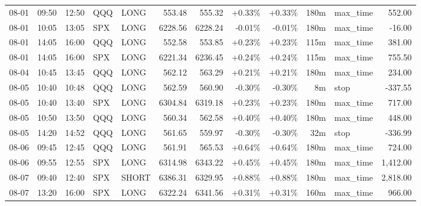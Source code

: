 \documentclass[11pt,a4paper,twoside]{article}
\begin{document}
\begin{center}
\begin{longtable}{>{\color{txtmain}}l l l l l r r r r r >{\color{txtmain}}l r}
08-01 & 09:50 & 12:50 & QQQ & LONG & 553.48 & 555.32 & \textcolor{wingreen}{+0.33\%} & \textcolor{wingreen}{+0.33\%} & 180m & max\_time & \textcolor{wingreen}{552.00} \\
08-01 & 10:05 & 13:05 & SPX & LONG & 6228.56 & 6228.24 & \textcolor{lossred}{-0.01\%} & \textcolor{lossred}{-0.01\%} & 180m & max\_time & \textcolor{lossred}{-16.00} \\
08-01 & 14:05 & 16:00 & QQQ & LONG & 552.58 & 553.85 & \textcolor{wingreen}{+0.23\%} & \textcolor{wingreen}{+0.23\%} & 115m & max\_time & \textcolor{wingreen}{381.00} \\
08-01 & 14:05 & 16:00 & SPX & LONG & 6221.34 & 6236.45 & \textcolor{wingreen}{+0.24\%} & \textcolor{wingreen}{+0.24\%} & 115m & max\_time & \textcolor{wingreen}{755.50} \\
08-04 & 10:45 & 13:45 & QQQ & LONG & 562.12 & 563.29 & \textcolor{wingreen}{+0.21\%} & \textcolor{wingreen}{+0.21\%} & 180m & max\_time & \textcolor{wingreen}{234.00} \\
08-05 & 10:40 & 10:48 & QQQ & LONG & 562.59 & 560.90 & \textcolor{lossred}{-0.30\%} & \textcolor{lossred}{-0.30\%} & 8m & stop & \textcolor{lossred}{-337.55} \\
08-05 & 10:40 & 13:40 & SPX & LONG & 6304.84 & 6319.18 & \textcolor{wingreen}{+0.23\%} & \textcolor{wingreen}{+0.23\%} & 180m & max\_time & \textcolor{wingreen}{717.00} \\
08-05 & 10:50 & 13:50 & QQQ & LONG & 560.34 & 562.58 & \textcolor{wingreen}{+0.40\%} & \textcolor{wingreen}{+0.40\%} & 180m & max\_time & \textcolor{wingreen}{448.00} \\
08-05 & 14:20 & 14:52 & QQQ & LONG & 561.65 & 559.97 & \textcolor{lossred}{-0.30\%} & \textcolor{lossred}{-0.30\%} & 32m & stop & \textcolor{lossred}{-336.99} \\
08-06 & 09:45 & 12:45 & QQQ & LONG & 561.91 & 565.53 & \textcolor{wingreen}{+0.64\%} & \textcolor{wingreen}{+0.64\%} & 180m & max\_time & \textcolor{wingreen}{724.00} \\
08-06 & 09:55 & 12:55 & SPX & LONG & 6314.98 & 6343.22 & \textcolor{wingreen}{+0.45\%} & \textcolor{wingreen}{+0.45\%} & 180m & max\_time & \textcolor{wingreen}{1,412.00} \\
08-07 & 09:40 & 12:40 & SPX & SHORT & 6386.31 & 6329.95 & \textcolor{wingreen}{+0.88\%} & \textcolor{wingreen}{+0.88\%} & 180m & max\_time & \textcolor{wingreen}{2,818.00} \\
08-07 & 13:20 & 16:00 & SPX & LONG & 6322.24 & 6341.56 & \textcolor{wingreen}{+0.31\%} & \textcolor{wingreen}{+0.31\%} & 160m & max\_time & \textcolor{wingreen}{966.00} \\

\end{longtable}
\end{center}
\end{document}
